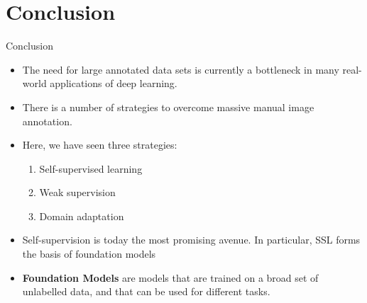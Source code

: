 \documentclass[xcolor=pdftex,dvipsnames,table]{beamer}
\begin{document}








\section{Conclusion}

\begin{frame}{Conclusion}
\begin{itemize}
   \item The need for large annotated data sets is currently a bottleneck in many real-world applications of deep learning. 
   \item There is a number of strategies to overcome massive manual image annotation. 
   \item Here, we have seen three strategies:
   \begin{enumerate}
      \item Self-supervised learning
      \item Weak supervision
      \item Domain adaptation
   \end{enumerate}
   \item Self-supervision is today the most promising avenue. In particular, SSL forms the basis of foundation models
   \item \textbf{Foundation Models} are models that are trained on a broad set of unlabelled data, and that can be used for different tasks.


\end{itemize}
\end{frame}
\end{document}
